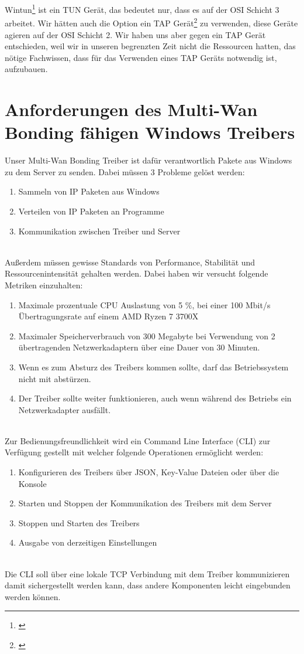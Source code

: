 \newpage
\noindent
Wintun\footnote[1]{\cite[Vgl.][]{1}} ist ein TUN Gerät, das bedeutet nur, dass es auf der OSI Schicht 3 arbeitet. Wir hätten auch die Option ein TAP Gerät\footnote[1]{\cite[Vgl.][]{28}} zu verwenden, diese Geräte agieren auf der OSI Schicht 2. Wir haben uns aber gegen ein TAP Gerät entschieden, weil wir in unseren begrenzten Zeit nicht die Ressourcen hatten, das nötige Fachwissen, dass für das Verwenden eines TAP Geräts notwendig ist, aufzubauen.

\section{Anforderungen des Multi-Wan Bonding fähigen Windows Treibers}

Unser Multi-Wan Bonding Treiber ist dafür verantwortlich Pakete aus Windows zu dem Server zu senden. Dabei müssen 3 Probleme gelöst werden:
\\
\begin{enumerate}
    \item Sammeln von IP Paketen aus Windows
    \item Verteilen von IP Paketen an Programme
    \item Kommunikation zwischen Treiber und Server
\end{enumerate}
\ \\
Außerdem müssen gewisse Standards von Performance, Stabilität und Ressourcenintensität gehalten werden. Dabei haben wir versucht folgende Metriken einzuhalten:
\\
\begin{enumerate}
    \item Maximale prozentuale CPU Auslastung von 5 \%, bei einer 100 Mbit/s Übertragungsrate auf einem AMD Ryzen 7 3700X
    \item Maximaler Speicherverbrauch von 300 Megabyte bei Verwendung von 2 übertragenden Netzwerkadaptern über eine Dauer von 30 Minuten.
    \item Wenn es zum Absturz des Treibers kommen sollte, darf das Betriebssystem nicht mit abstürzen.
    \item Der Treiber sollte weiter funktionieren, auch wenn während des Betriebs ein Netzwerkadapter ausfällt.
\end{enumerate}
\ \\
Zur Bedienungsfreundlichkeit wird ein Command Line Interface (CLI)  zur Verfügung gestellt mit welcher folgende Operationen ermöglicht werden:
\\
\begin{enumerate}
    \item Konfigurieren des Treibers über JSON, Key-Value Dateien oder über die Konsole
    \item Starten und Stoppen der Kommunikation des Treibers mit dem Server
    \item Stoppen und Starten des Treibers
    \item Ausgabe von derzeitigen Einstellungen
\end{enumerate}
\ \\
Die CLI soll über eine lokale TCP Verbindung mit dem Treiber kommunizieren damit sichergestellt werden kann, dass andere Komponenten leicht eingebunden werden können.

